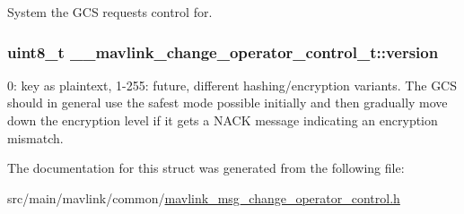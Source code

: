 System the G\+C\+S requests control for. 

\hypertarget{struct____mavlink__change__operator__control__t_a033ed1de1f96ee19a64572952e29da39}{
\subsubsection[{version}]{\setlength{\rightskip}{0pt plus 5cm}uint8\+\_\+t \+\_\+\+\_\+mavlink\+\_\+change\+\_\+operator\+\_\+control\+\_\+t\+::version}}\label{struct____mavlink__change__operator__control__t_a033ed1de1f96ee19a64572952e29da39}


0\+: key as plaintext, 1-\/255\+: future, different hashing/encryption variants. The G\+C\+S should in general use the safest mode possible initially and then gradually move down the encryption level if it gets a N\+A\+C\+K message indicating an encryption mismatch. 



The documentation for this struct was generated from the following file\+:\begin{DoxyCompactItemize}
\item 
src/main/mavlink/common/\hyperlink{mavlink__msg__change__operator__control_8h}{mavlink\+\_\+msg\+\_\+change\+\_\+operator\+\_\+control.\+h}\end{DoxyCompactItemize}

